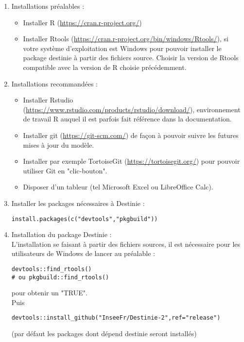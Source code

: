 \begin{enumerate}
\item Installations préalables : \\
\begin{itemize}
\item Installer	R (\url{https://cran.r-project.org/}) 
\item Installer	Rtools (\url{https://cran.r-project.org/bin/windows/Rtools/}), si votre système d'exploitation est 				Windows pour pouvoir installer le package destinie à partir des fichiers source. Choisir la version de Rtools compatible 		avec la version de R choisie précédemment. 
\end{itemize}
\item Installations recommandées : \\
\begin{itemize}
\item Installer	Rstudio (\url{https://www.rstudio.com/products/rstudio/download/}), environnement de travail R auquel il est parfois fait référence dans la documentation.
\item Installer git (\url{https://git-scm.com/}) de façon à pouvoir suivre les futures mises à jour du modèle.
\item Installer par exemple TortoiseGit (\url{https://tortoisegit.org/}) pour pouvoir utiliser Git en "clic-bouton".
\item Disposer d'un tableur (tel Microsoft Excel ou LibreOffice Calc).
\end{itemize}
\item Installer les packages nécessaires à Destinie :\\
\begin{lstlisting}
install.packages(c("devtools","pkgbuild"))
\end{lstlisting}
\item Installation du package Destinie :\\
L'installation se faisant à partir des fichiers sources, il est nécessaire pour les utilisateurs de Windows de lancer au préalable : 
\begin{lstlisting}
devtools::find_rtools()
# ou pkgbuild::find_rtools()
\end{lstlisting} pour obtenir un "TRUE".\\
Puis \begin{lstlisting}
devtools::install_github("InseeFr/Destinie-2",ref="release")
\end{lstlisting} (par défaut les packages dont dépend destinie seront installés)
\end{enumerate}

